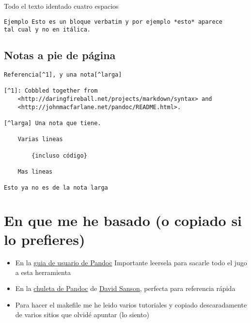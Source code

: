 \documentclass[12pt,spanish,]{article}
\providecommand{\tightlist}{%
  \setlength{\itemsep}{0pt}\setlength{\parskip}{0pt}}
\begin{document}
Todo el texto identado cuatro espacios

\begin{verbatim}
Ejemplo Esto es un bloque verbatim y por ejemplo *esto* aparece
tal cual y no en itálica.
\end{verbatim}

\hypertarget{notas-a-pie-de-puxe1gina}{%
\subsection{Notas a pie de página}\label{notas-a-pie-de-puxe1gina}}

\begin{verbatim}
Referencia[^1], y una nota[^larga]

[^1]: Cobbled together from
    <http://daringfireball.net/projects/markdown/syntax> and
    <http://johnmacfarlane.net/pandoc/README.html>.
    
[^larga] Una nota que tiene.

    Varias lineas
    
        {incluso código}
    
    Mas lineas
    
Esto ya no es de la nota larga
\end{verbatim}

\hypertarget{en-que-me-he-basado-o-copiado-si-lo-prefieres}{%
\section{En que me he basado (o copiado si lo
prefieres)}\label{en-que-me-he-basado-o-copiado-si-lo-prefieres}}

\begin{itemize}
\tightlist
\item
  En la \href{http://pandoc.org/README.html}{guia de usuario de Pandoc}
  Importante leersela para sacarle todo el jugo a esta herramienta
\item
  En la
  \href{https://github.com/dsanson/Pandoc.tmbundle/blob/master/Support/doc/cheatsheet.markdown}{chuleta
  de Pandoc} de \href{https://github.com/dsanson}{David Sanson},
  perfecta para referencia rápida
\item
  Para hacer el makefile me he leido varios tutoriales y copiado
  descaradamente de varios sitios que olvidé apuntar (lo siento)
\end{itemize}
\end{document}

